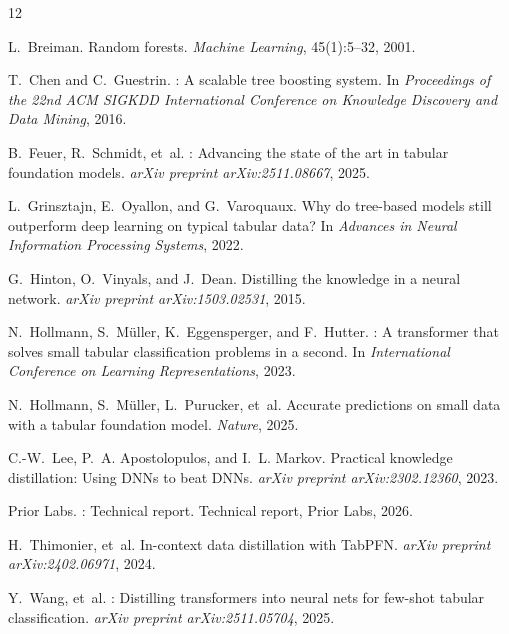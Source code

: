 \documentclass[10pt]{article}
\begin{document}

\begin{thebibliography}{12}

L.~Breiman.
\newblock Random forests.
\newblock \emph{Machine Learning}, 45(1):5--32, 2001.

T.~Chen and C.~Guestrin.
: A scalable tree boosting system.
\newblock In \emph{Proceedings of the 22nd ACM SIGKDD International
Conference on Knowledge Discovery and Data Mining}, 2016.

B.~Feuer, R.~Schmidt, et~al.
: Advancing the state of the art in tabular
foundation models.
\newblock \emph{arXiv preprint arXiv:2511.08667}, 2025.

L.~Grinsztajn, E.~Oyallon, and G.~Varoquaux.
\newblock Why do tree-based models still outperform deep learning on
typical tabular data?
\newblock In \emph{Advances in Neural Information Processing Systems},
2022.

G.~Hinton, O.~Vinyals, and J.~Dean.
\newblock Distilling the knowledge in a neural network.
\newblock \emph{arXiv preprint arXiv:1503.02531}, 2015.

N.~Hollmann, S.~Müller, K.~Eggensperger, and F.~Hutter.
: A transformer that solves small tabular
classification problems in a second.
\newblock In \emph{International Conference on Learning
Representations}, 2023.

N.~Hollmann, S.~Müller, L.~Purucker, et~al.
\newblock Accurate predictions on small data with a tabular
foundation model.
\newblock \emph{Nature}, 2025.

C.-W.~Lee, P.~A. Apostolopulos, and I.~L. Markov.
\newblock Practical knowledge distillation: Using {DNNs} to beat
{DNNs}.
\newblock \emph{arXiv preprint arXiv:2302.12360}, 2023.

Prior Labs.
: Technical report.
\newblock Technical report, Prior Labs, 2026.

H.~Thimonier, et~al.
\newblock In-context data distillation with {TabPFN}.
\newblock \emph{arXiv preprint arXiv:2402.06971}, 2024.

Y.~Wang, et~al.
: Distilling transformers into neural nets for
few-shot tabular classification.
\newblock \emph{arXiv preprint arXiv:2511.05704}, 2025.

\end{thebibliography}
\end{document}
